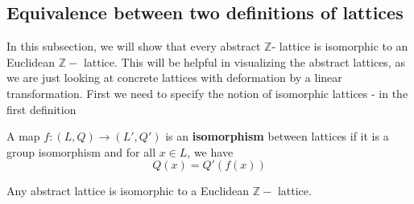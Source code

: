 \subsection{Equivalence between two definitions of lattices}
In this subsection, we will show that every abstract $\mathbb{Z}$- lattice is isomorphic to an Euclidean $\mathbb{Z}-$ lattice.
This will be helpful in visualizing the abstract lattices, as we are just looking at concrete lattices with deformation by a linear transformation.
First we need to specify the notion of isomorphic lattices - in the first definition
\begin{definition}
    A map $f \colon (L,Q)   \to (L',Q')$  is an \textbf{isomorphism} between lattices if it is a group isomorphism and
    for all $x \in L$, we have
    \[Q(x) = Q'(f(x)) \]
\end{definition}
\begin{prop}\label{equiv-def}
    Any abstract lattice is isomorphic to a Euclidean $\mathbb{Z}-$ lattice.
\end{prop}
